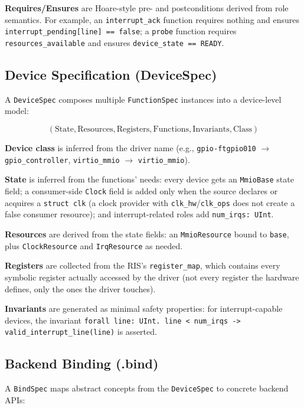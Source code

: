 \documentclass[sigplan, screen, review, anonymous]{acmart}
\newcommand{\rislang}{RIS}
\begin{document}
\textbf{Requires/Ensures} are Hoare-style pre- and postconditions derived from role semantics. For example, an \texttt{interrupt\_ack} function requires nothing and ensures \texttt{interrupt\_pending[line] == false}; a \texttt{probe} function requires \texttt{resources\_available} and ensures \texttt{device\_state == READY}.

\subsection{Device Specification (DeviceSpec)}

A \texttt{DeviceSpec} composes multiple \texttt{FunctionSpec} instances into a device-level model:

\[
(\text{State}, \text{Resources}, \text{Registers}, \text{Functions}, \text{Invariants}, \text{Class})
\]

\textbf{Device class} is inferred from the driver name (e.g., \texttt{gpio-ftgpio010} $\rightarrow$ \texttt{gpio\_controller}, \texttt{virtio\_mmio} $\rightarrow$ \texttt{virtio\_mmio}).

\textbf{State} is inferred from the functions' needs: every device gets an \texttt{MmioBase} state field; a consumer-side \texttt{Clock} field is added only when the source declares or acquires a \texttt{struct clk} (a clock provider with \texttt{clk\_hw}/\texttt{clk\_ops} does not create a false consumer resource); and interrupt-related roles add \texttt{num\_irqs: UInt}.

\textbf{Resources} are derived from the state fields: an \texttt{MmioResource} bound to \texttt{base}, plus \texttt{ClockResource} and \texttt{IrqResource} as needed.

\textbf{Registers} are collected from the \rislang's \texttt{register\_map}, which contains every symbolic register actually accessed by the driver (not every register the hardware defines, only the ones the driver touches).

\textbf{Invariants} are generated as minimal safety properties: for interrupt-capable devices, the invariant \texttt{forall line: UInt. line < num\_irqs -> valid\_interrupt\_line(line)} is asserted.

\subsection{Backend Binding (.bind)}

A \texttt{BindSpec} maps abstract concepts from the \texttt{DeviceSpec} to concrete backend APIs:
\end{document}
